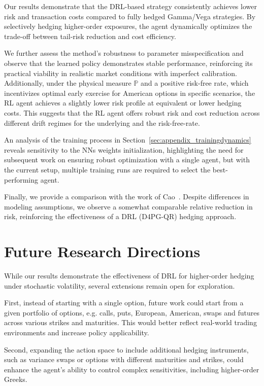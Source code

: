 \documentclass[a4paper,fleqn]{cas-dc}
\begin{document}
Our results demonstrate that the DRL-based strategy consistently achieves lower risk and transaction costs compared to fully hedged Gamma/Vega strategies. By selectively hedging higher-order exposures, the agent dynamically optimizes the trade-off between tail-risk reduction and cost efficiency.

We further assess the method's robustness to parameter misspecification and observe that the learned policy demonstrates stable performance, reinforcing its practical viability in realistic market conditions with imperfect calibration. Additionally, under the physical measure $\mathbb{P}$ and a positive risk-free rate, which incentivizes optimal early exercise for American options in specific scenarios, the RL agent achieves a slightly lower risk profile at equivalent or lower hedging costs. This suggests that the RL agent offers robust risk and cost reduction across different drift regimes for the underlying and the risk-free-rate.

An analysis of the training process in Section~\ref{sec:appendix_trainingdynamics} reveals sensitivity to the NNs weights initialization, highlighting the need for subsequent work on ensuring robust optimization with a single agent, but with the current setup, multiple training runs are required to select the best-performing agent.

Finally, we provide a comparison with the work of Cao~\cite{DH_1}. Despite differences in modeling assumptions, we observe a somewhat comparable relative reduction in risk, reinforcing the effectiveness of a DRL (D4PG-QR) hedging approach.

\section{Future Research Directions}
\label{sec:FutureDirections}

While our results demonstrate the effectiveness of DRL for higher-order hedging under stochastic volatility, several extensions remain open for exploration.

First, instead of starting with a single option, future work could start from a given portfolio of options, e.g. calls, puts, European, American, swaps and futures across various strikes and maturities. This would better reflect real-world trading environments and increase policy applicability.

Second, expanding the action space to include additional hedging instruments, such as variance swaps or options with different maturities and strikes, could enhance the agent’s ability to control complex sensitivities, including higher-order Greeks.
\end{document}

